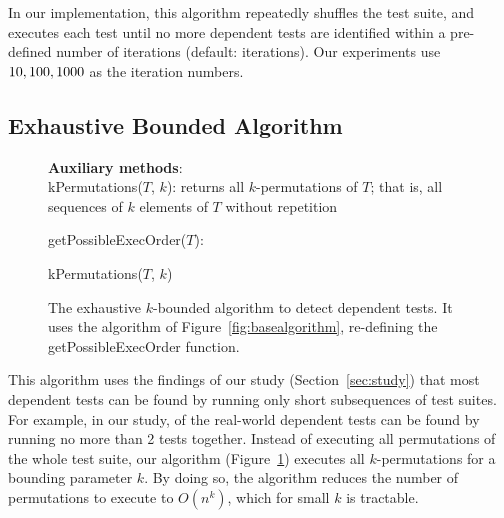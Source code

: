 In our implementation, this algorithm repeatedly
shuffles the test suite, and executes each test until
no more dependent tests are identified within a
pre-defined number of iterations (default: \smalltrialnum iterations).
Our experiments use $10,
100, 1000$ as the iteration numbers.



\subsection{Exhaustive Bounded Algorithm}
\label{sec:basic}

\begin{figure}[t]
\textbf{Auxiliary methods}:\\
kPermutations($T$, $k$): returns all $k$-permutations of $T$; that is, all
sequences of $k$ elements of $T$ without repetition

\medskip

getPossibleExecOrder($T$):\\
\vspace{-5mm}
\begin{algorithmic}[1]
\RETURN kPermutations($T$, $k$)
\end{algorithmic}

\vspace{-3mm}
\caption {The exhaustive $k$-bounded algorithm to detect dependent tests.
It uses the algorithm of Figure~\ref{fig:basealgorithm}, re-defining the
getPossibleExecOrder function.
} 
\label{fig:exhaustivealgorithm}
\end{figure}



This algorithm uses the findings of our study
(Section~\ref{sec:study})
that most dependent tests can be found by running only short
subsequences of test suites. For example,
in our study, \pertange of the real-world dependent tests
can be found by running no more than 2 tests together.
Instead of executing all permutations of the
whole test suite, our algorithm (Figure~\ref{fig:exhaustivealgorithm})
executes all $k$-permutations for a bounding
parameter $k$.
By doing so, the algorithm reduces
the number of permutations to execute
to $O(n^k)$, which for small $k$ is tractable. 


